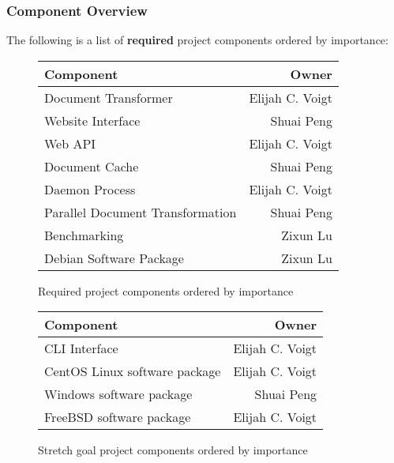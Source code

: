 \subsubsection{Component Overview}
\label{component-overview}

The following is a list of \textbf{required} project components ordered by importance:

\begin{figure}[H]
  \begin{center}
      \begin{tabular}{ | l | r | }
      \hline
        Component & Owner \\ \hline
        Document Transformer & Elijah C. Voigt \\ \hline
        Website Interface & Shuai Peng \\ \hline
        Web API & Elijah C. Voigt \\ \hline
        Document Cache & Shuai Peng \\ \hline
        Daemon Process & Elijah C. Voigt \\ \hline
        Parallel Document Transformation & Shuai Peng\\ \hline
        Benchmarking & Zixun Lu \\ \hline
        Debian Software Package & Zixun Lu \\ \hline
      \end{tabular}
  \end{center}
  \caption{Required project components ordered by importance}
\end{figure}

\begin{figure}[H]
  \begin{center}
      \begin{tabular}{ | l | r | }
      \hline
        Component & Owner \\ \hline
        CLI Interface & Elijah C. Voigt \\ \hline
        CentOS Linux software package & Elijah C. Voigt \\ \hline
        Windows software package & Shuai Peng \\ \hline
        FreeBSD software package & Elijah C. Voigt  \\ \hline
      \end{tabular}
  \end{center}
  \caption{Stretch goal project components ordered by importance}
\end{figure}

